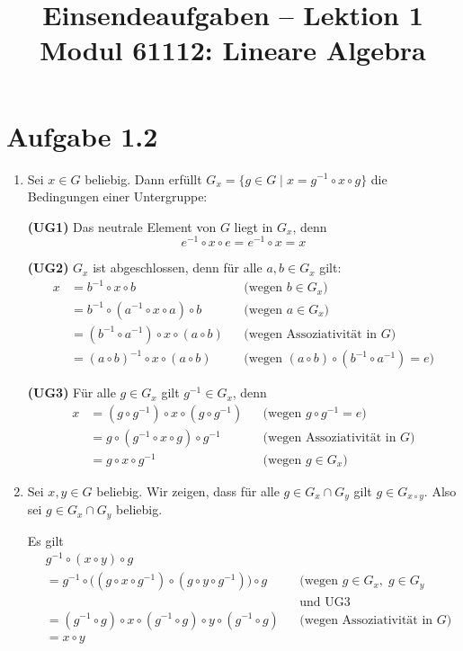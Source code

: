 \documentclass[a4paper,12pt]{article}
\title{Einsendeaufgaben -- Lektion 1\\[0.5em]
\large Modul 61112: Lineare Algebra}
\author{}
\date{}
\begin{document}
\maketitle

\section*{Aufgabe 1.2}

\begin{enumerate}[label=\alph*)]

\item Sei $x \in G$ beliebig. Dann erfüllt $G_x = \{g \in G \mid x = g^{-1} \circ x \circ g\}$
die Bedingungen einer Untergruppe:

\textbf{(UG1)} Das neutrale Element von $G$ liegt in $G_x$, denn
\[
  e^{-1} \circ x \circ e = e^{-1} \circ x = x
\]

\textbf{(UG2)} $G_x$ ist abgeschlossen, denn für alle $a, b \in G_x$ gilt:
\begin{align*}
  x &= b^{-1} \circ x \circ b
    && \text{(wegen } b \in G_x\text{)} \\
    &= b^{-1} \circ (a^{-1} \circ x \circ a) \circ b
    && \text{(wegen } a \in G_x\text{)} \\
    &= (b^{-1} \circ a^{-1}) \circ x \circ (a \circ b)
    && \text{(wegen Assoziativität in } G\text{)} \\
    &= (a \circ b)^{-1} \circ x \circ (a \circ b)
    && \text{(wegen } (a \circ b) \circ (b^{-1} \circ a^{-1}) = e\text{)}
\end{align*}

\textbf{(UG3)} Für alle $g \in G_x$ gilt $g^{-1} \in G_x$, denn
\begin{align*}
  x &= (g \circ g^{-1}) \circ x \circ (g \circ g^{-1})
    && \text{(wegen } g \circ g^{-1} = e\text{)} \\
    &= g \circ (g^{-1} \circ x \circ g) \circ g^{-1}
    && \text{(wegen Assoziativität in } G\text{)} \\
    &= g \circ x \circ g^{-1}
    && \text{(wegen } g \in G_x\text{)}
\end{align*}

\item Sei $x, y \in G$ beliebig. Wir zeigen, dass für alle $g \in G_x \cap G_y$ gilt
$g \in G_{x \circ y}$. Also sei $g \in G_x \cap G_y$ beliebig.

Es gilt
\begin{align*}
  &g^{-1} \circ (x \circ y) \circ g \\
  &= g^{-1} \circ \bigl((g \circ x \circ g^{-1}) \circ (g \circ y \circ g^{-1})\bigr) \circ g
    && \text{(wegen } g \in G_x,\; g \in G_y \\
  & && \text{und UG3} \\
  &= (g^{-1} \circ g) \circ x \circ (g^{-1} \circ g) \circ y \circ (g^{-1} \circ g)
    && \text{(wegen Assoziativität in } G\text{)} \\
  &= x \circ y
\end{align*}

\end{enumerate}
\end{document}
